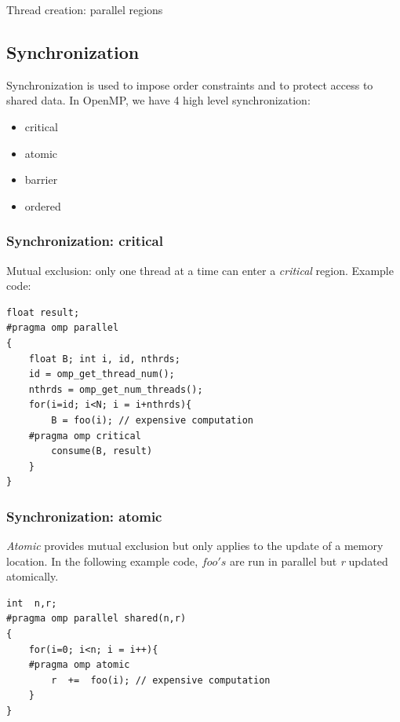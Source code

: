 \documentclass[twoside]{article}
\begin{document}
\begin{center}
Thread creation: parallel regions
\end{center}

\subsection{Synchronization}
Synchronization is used to impose order constraints and to protect access to shared data. In OpenMP, we have 4 high level synchronization:
\begin{itemize}
    \itemsep-0.2em
    \item critical
    \item atomic
    \item barrier
    \item ordered
\end{itemize}

\subsubsection{Synchronization: critical}
Mutual exclusion: only one thread at a time can enter a {\it critical} region. Example code:
\begin{center}
\begin{lstlisting}[linewidth=17cm]
float result; 
#pragma omp parallel 
{ 
    float B; int i, id, nthrds;
    id = omp_get_thread_num(); 
    nthrds = omp_get_num_threads();
    for(i=id; i<N; i = i+nthrds){ 
        B = foo(i); // expensive computation
    #pragma omp critical
        consume(B, result)
    }
} 
\end{lstlisting}
\end{center}


\subsubsection{Synchronization: atomic}
{\it Atomic} provides mutual exclusion but only applies to the update of a memory location. In the following example code, $foo's$ are run in parallel but {\it r} updated atomically.
\begin{center}
\begin{lstlisting}[linewidth=17cm]
int  n,r;
#pragma omp parallel shared(n,r)
{ 
    for(i=0; i<n; i = i++){ 
    #pragma omp atomic
        r  +=  foo(i); // expensive computation
    }
} 
\end{lstlisting}
\end{center}
\end{document}
